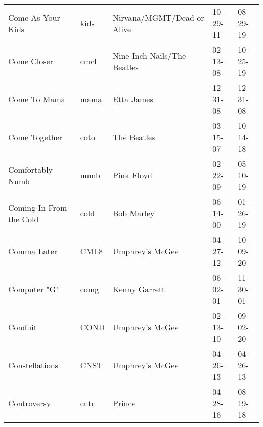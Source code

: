 \begin{longtable}{p{}p{}p{}p{}p{}}
                                                       Come As Your Kids &          kids &                               Nirvana/MGMT/Dead or Alive &              10-29-11 &             08-29-19 \\
                                                             Come Closer &          cmcl &                              Nine Inch Nails/The Beatles &              02-13-08 &             10-25-19 \\
                                                            Come To Mama &          mama &                                               Etta James &              12-31-08 &             12-31-08 \\
                                                           Come Together &          coto &                                              The Beatles &              03-15-07 &             10-14-18 \\
                                                        Comfortably Numb &          numb &                                               Pink Floyd &              02-22-09 &             05-10-19 \\
                                                 Coming In From the Cold &          cold &                                               Bob Marley &              06-14-00 &             01-26-19 \\
                                                             Comma Later &          CML8 &                                          Umphrey's McGee &              04-27-12 &             10-09-20 \\
                                                            Computer "G" &          comg &                                            Kenny Garrett &              06-02-01 &             11-30-01 \\
                                                                 Conduit &          COND &                                          Umphrey's McGee &              02-13-10 &             09-02-20 \\
                                                          Constellations &          CNST &                                          Umphrey's McGee &              04-26-13 &             04-26-13 \\
                                                             Controversy &          cntr &                                                   Prince &              04-28-16 &             08-19-18 \\

\end{longtable}
